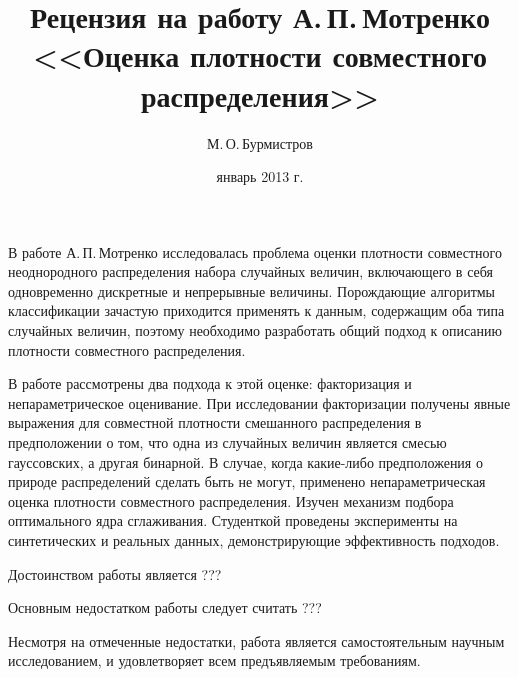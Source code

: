 \documentclass[12pt,a4paper,oneside]{article}
\begin{document}
\title{Рецензия на работу А.\,П.\,Мотренко \\ <<Оценка плотности совместного распределения>>}
\author{М.\,О.\,Бурмистров}
\date{январь 2013 г.}
\maketitle

В работе А.\,П.\,Мотренко исследовалась проблема оценки плотности совместного неоднородного распределения набора случайных величин, включающего в себя одновременно дискретные и непрерывные величины. 
Порождающие алгоритмы классификации зачастую приходится применять к данным, содержащим оба типа случайных величин, поэтому необходимо разработать общий подход к описанию плотности совместного распределения.

В работе рассмотрены два подхода к этой оценке: факторизация и непараметрическое оценивание. 
При исследовании факторизации получены явные выражения для совместной плотности смешанного распределения в предположении о том, что одна из случайных величин является смесью гауссовских, а другая бинарной. 
В случае, когда какие-либо предположения о природе распределений сделать быть не могут, применено непараметрическая оценка плотности совместного распределения. 
Изучен механизм подбора оптимального ядра сглаживания. 
Студенткой проведены эксперименты на синтетических и реальных данных, демонстрирующие эффективность подходов.

Достоинством работы является ???

Основным недостатком работы следует считать ???

Несмотря на отмеченные недостатки, работа является самостоятельным научным исследованием, и удовлетворяет всем предъявляемым требованиям.
\end{document}
